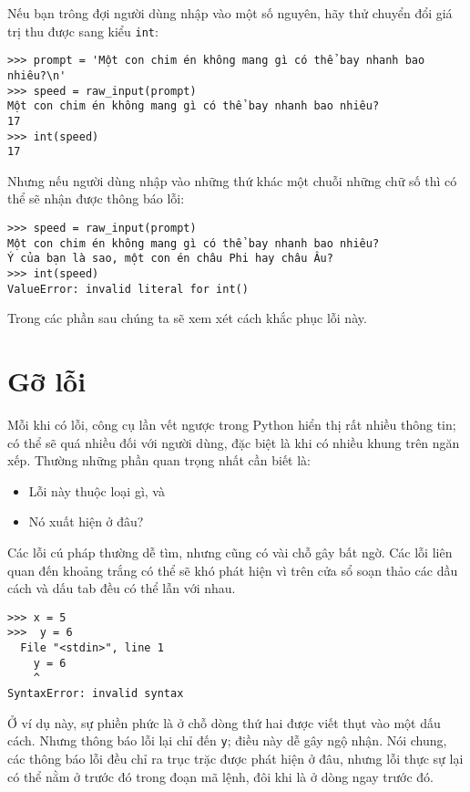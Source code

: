 \documentclass[11pt]{book}
\begin{document}

Nếu bạn trông đợi người dùng nhập vào một số nguyên, hãy thử chuyển đổi
giá trị thu được sang kiểu {\tt int}:

\beforeverb
\begin{verbatim}
>>> prompt = 'Một con chim én không mang gì có thể bay nhanh bao nhiêu?\n'
>>> speed = raw_input(prompt)
Một con chim én không mang gì có thể bay nhanh bao nhiêu?
17
>>> int(speed)
17
\end{verbatim}
\afterverb
%
Nhưng nếu người dùng nhập vào những thứ khác một chuỗi những chữ số thì
có thể sẽ nhận được thông báo lỗi:

\beforeverb
\begin{verbatim}
>>> speed = raw_input(prompt)
Một con chim én không mang gì có thể bay nhanh bao nhiêu?
Ý của bạn là sao, một con én châu Phi hay châu Âu?
>>> int(speed)
ValueError: invalid literal for int()
\end{verbatim}
\afterverb
%
Trong các phần sau chúng ta sẽ xem xét cách khắc phục lỗi này.



\section{Gỡ lỗi}
\label{whitespace}

Mỗi khi có lỗi, công cụ lần vết ngược trong Python hiển thị rất
nhiều thông tin; có thể sẽ quá nhiều đối với người dùng, đặc biệt
là khi có nhiều khung trên ngăn xếp. Thường những phần quan trọng nhất
cần biết là:

\begin{itemize}

\item Lỗi này thuộc loại gì, và 

\item Nó xuất hiện ở đâu?

\end{itemize}

Các lỗi cú pháp thường dễ tìm, nhưng cũng có vài chỗ gây bất ngờ.
Các lỗi liên quan đến khoảng trắng có thể sẽ khó phát hiện vì trên
cửa sổ soạn thảo các dầu cách và dấu tab đều có thể lẫn với nhau.


\beforeverb
\begin{verbatim}
>>> x = 5
>>>  y = 6
  File "<stdin>", line 1
    y = 6
    ^
SyntaxError: invalid syntax
\end{verbatim}
\afterverb
%
Ở ví dụ này, sự phiền phức là ở chỗ dòng thứ hai được viết thụt vào
một dấu cách. Nhưng thông báo lỗi lại chỉ đến {\tt y}; điều này dễ gây
ngộ nhận. Nói chung, các thông báo lỗi đều chỉ ra trục trặc được phát
hiện ở đâu, nhưng lỗi thực sự lại có thể nằm ở trước đó trong đoạn mã
lệnh, đôi khi là ở dòng ngay trước đó.
\end{document}
